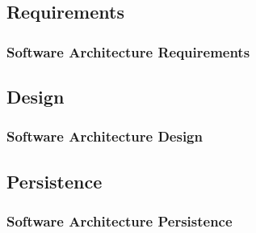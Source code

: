 \documentclass{beamer}
\begin{document}
	\subsection{Requirements}
		\begin{frame}
		\frametitle{Software Architecture Requirements}
		
		\end{frame}
		
	\subsection{Design}
		\begin{frame}
		\frametitle{Software Architecture Design}
		
		\end{frame}
		
	\subsection{Persistence}
		\begin{frame}
		\frametitle{Software Architecture Persistence}
		
		\end{frame}
		
\end{document}
